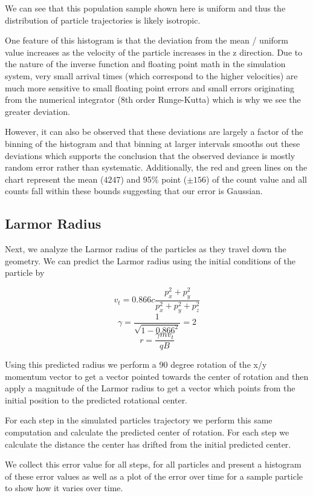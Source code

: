 \documentclass[12pt,letterpaper]{article}
\begin{document}
We can see that this population sample shown here is uniform and thus the distribution of particle trajectories is likely isotropic. 

One feature of this histogram is that the deviation from the mean / uniform value increases as the velocity of the particle increases in the z direction. Due to the nature of the inverse function and floating point math in the simulation system, very small arrival times (which correspond to the higher velocities) are much more sensitive to small floating point errors and small errors originating from the numerical integrator (8th order Runge-Kutta) which is why we see the greater deviation. 

However, it can also be observed that these deviations are largely a factor of the binning of the histogram and that binning at larger intervals smooths out these deviations which supports the conclusion that the observed deviance is mostly random error rather than systematic. Additionally, the red and green lines on the chart represent the mean ($4247$) and 95\% point ($\pm 156$) of the count value and all counts fall within these bounds suggesting that our error is Gaussian.

\subsection{Larmor Radius}

Next, we analyze the Larmor radius of the particles as they travel down the geometry. We can predict the Larmor radius using the initial conditions of the particle by

\[ v_{t} = 0.866c\frac{p_x^2 + p_y^2}{p_x^2 + p_y^2 + p_z^2} \]
\[ \gamma = \frac{1}{\sqrt{1 - 0.866^2}} = 2 \]
\[ r = \frac{\gamma mv_t}{qB}  \]

Using this predicted radius we perform a 90 degree rotation of the x/y momentum vector to get a vector pointed towards the center of rotation and then apply a magnitude of the Larmor radius to get a vector which points from the initial position to the predicted rotational center.

For each step in the simulated particles trajectory we perform this same computation and calculate the predicted center of rotation. For each step we calculate the distance the center has drifted from the initial predicted center. 

We collect this error value for all steps, for all particles and present a histogram of these error values as well as a plot of the error over time for a sample particle to show how it varies over time.
\end{document}

